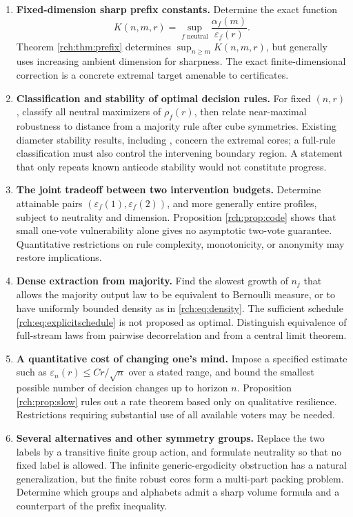 \documentclass[11pt]{article}
\theoremstyle{definition}
\theoremstyle{remark}
\newcommand{\eps}{\varepsilon}
\begin{document}
\begin{enumerate}[leftmargin=*,label=\textbf{Q\arabic*.}]
\item \textbf{Fixed-dimension sharp prefix constants.}
Determine the exact function
\[
 K(n,m,r)=\sup_{f\text{ neutral}}
 \frac{\alpha_f(m)}{\eps_f(r)}.
\]
Theorem \ref{rch:thm:prefix} determines \(\sup_{n\ge m}K(n,m,r)\), but generally
uses increasing ambient dimension for sharpness. The exact finite-dimensional
correction is a concrete extremal target amenable to certificates.

\item \textbf{Classification and stability of optimal decision rules.}
For fixed \((n,r)\), classify all neutral maximizers of \(\rho_f(r)\), then
relate near-maximal robustness to distance from a majority rule after cube
symmetries. Existing diameter stability results, including
\cite{WuEtAl}, concern the extremal cores; a full-rule classification must
also control the intervening boundary region. A statement that only repeats
known anticode stability would not constitute progress.

\item \textbf{The joint tradeoff between two intervention budgets.}
Determine attainable pairs \((\eps_f(1),\eps_f(2))\), and more generally
entire profiles, subject to neutrality and dimension. Proposition
\ref{rch:prop:code} shows that small one-vote vulnerability alone gives no
asymptotic two-vote guarantee. Quantitative restrictions on rule complexity,
monotonicity, or anonymity may restore implications.

\item \textbf{Dense extraction from majority.}
Find the slowest growth of \(n_j\) that allows the majority output law to be
equivalent to Bernoulli measure, or to have uniformly bounded density as in
\eqref{rch:eq:density}. The sufficient schedule \eqref{rch:eq:explicitschedule} is
not proposed as optimal. Distinguish equivalence of full-stream laws from
pairwise decorrelation and from a central limit theorem.

\item \textbf{A quantitative cost of changing one's mind.}
Impose a specified estimate such as
\(\eps_n(r)\le C r/\sqrt n\) over a stated range, and bound the smallest
possible number of decision changes up to horizon \(n\). Proposition
\ref{rch:prop:slow} rules out a rate theorem based only on qualitative resilience.
Restrictions requiring substantial use of all available voters may be needed.

\item \textbf{Several alternatives and other symmetry groups.}
Replace the two labels by a transitive finite group action, and formulate
neutrality so that no fixed label is allowed. The infinite generic-ergodicity
obstruction has a natural generalization, but the finite robust cores form a
multi-part packing problem. Determine which groups and alphabets admit a sharp
volume formula and a counterpart of the prefix inequality.


\end{enumerate}
\end{document}
